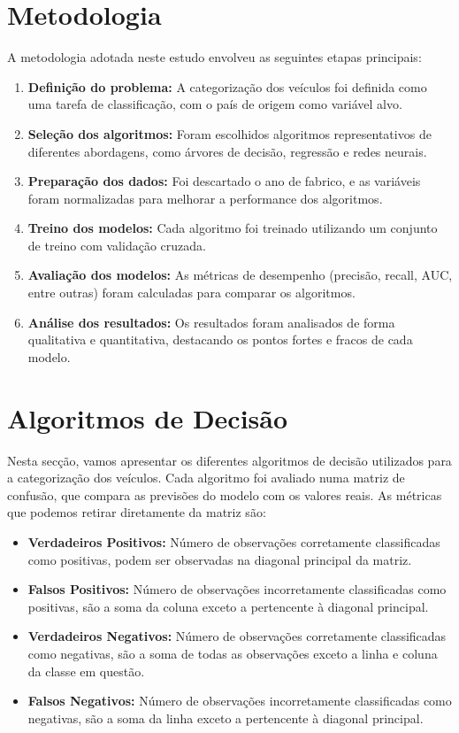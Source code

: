 \documentclass[conference]{IEEEtran}
\begin{document}
\section{Metodologia}
A metodologia adotada neste estudo envolveu as seguintes etapas principais:
\begin{enumerate}
	\item \textbf{Definição do problema:} A categorização dos veículos foi definida como uma tarefa de classificação, com o país de origem como variável alvo.
	\item \textbf{Seleção dos algoritmos:} Foram escolhidos algoritmos representativos de diferentes abordagens, como árvores de decisão, regressão e redes neurais.
	\item \textbf{Preparação dos dados:} Foi descartado o ano de fabrico, e as variáveis foram normalizadas para melhorar a performance dos algoritmos.
	\item \textbf{Treino dos modelos:} Cada algoritmo foi treinado utilizando um conjunto de treino com validação cruzada.
	\item \textbf{Avaliação dos modelos:} As métricas de desempenho (precisão, recall, AUC, entre outras) foram calculadas para comparar os algoritmos.
	\item \textbf{Análise dos resultados:} Os resultados foram analisados de forma qualitativa e quantitativa, destacando os pontos fortes e fracos de cada modelo.
\end{enumerate}

\section{Algoritmos de Decisão}
Nesta secção, vamos apresentar os diferentes algoritmos de decisão utilizados para a categorização dos veículos. Cada algoritmo foi avaliado numa matriz
de confusão, que compara as previsões do modelo com os valores reais. As métricas que podemos retirar diretamente da matriz são:
\begin{itemize}
	\item \textbf{Verdadeiros Positivos:} Número de observações corretamente classificadas como positivas, podem ser observadas na diagonal principal da matriz.
	\item \textbf{Falsos Positivos:} Número de observações incorretamente classificadas como positivas, são a soma da coluna exceto a pertencente à diagonal principal.
	\item \textbf{Verdadeiros Negativos:} Número de observações corretamente classificadas como negativas, são a soma de todas as observações exceto a linha e coluna
	      da classe em questão.
	\item \textbf{Falsos Negativos:} Número de observações incorretamente classificadas como negativas, são a soma da linha exceto a pertencente à diagonal principal.
\end{itemize}
\end{document}
